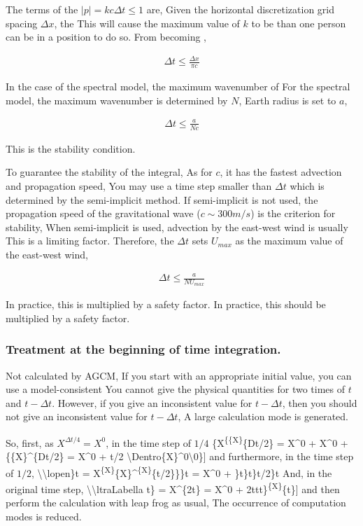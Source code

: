 The terms of the \(|p|=kc \Delta t \le 1\) are, Given the horizontal
discretization grid spacing \(\Delta x\), the This will cause the
maximum value of \(k\) to be \More than one person can be in a position
to do so. From becoming ,

\begin{eqnarray}
   \Delta t \le \frac{\Delta x}{\pi c}
\end{eqnarray}

In the case of the spectral model, the maximum wavenumber of For the
spectral model, the maximum wavenumber is determined by \(N\), Earth
radius is set to \(a\),

\begin{eqnarray}
   \Delta t \le \frac{a}{N c}  
\end{eqnarray}

This is the stability condition.

To guarantee the stability of the integral, As for \(c\), it has the
fastest advection and propagation speed, You may use a time step smaller
than \(\Delta t\) which is determined by the semi-implicit method. If
semi-implicit is not used, the propagation speed of the gravitational
wave (\(c \sim 300m/s\)) is the criterion for stability, When
semi-implicit is used, advection by the east-west wind is usually This
is a limiting factor. Therefore, the \(\Delta t\) sets \(U_{max}\) as
the maximum value of the east-west wind,

\begin{eqnarray}
   \Delta t \le \frac{a}{N U_{max}}  
\end{eqnarray}

In practice, this is multiplied by a safety factor. In practice, this
should be multiplied by a safety factor.

\hypertarget{treatment-at-the-beginning-of-time-integration.}{%
\subsubsection{Treatment at the beginning of time
integration.}\label{treatment-at-the-beginning-of-time-integration.}}

Not calculated by AGCM, If you start with an appropriate initial value,
you can use a model-consistent You cannot give the physical quantities
for two times of \(t\) and \(t-\Delta t\). However, if you give an
inconsistent value for \(t-\Delta t\), then you should not give an
inconsistent value for \(t-\Delta t\), A large calculation mode is
generated.

So, first, as \(X^{\Delta t/4} = X^0\), in the time step of \(1/4\)
\{X\textsuperscript{\{\{X\}}\{D\Delta t/2\} = X\^{}0 + X\^{}0 +
\{\{X\}\^{}\{D\Delta t/2\} = X\^{}0 + t/2
\textbackslash Dentro\{X\}\^{}0\textbackslash0\}{]} and furthermore, in
the time step of \(1/2\), \textbackslash\textbackslash lopen\}t =
X\textsuperscript{\{X\}}\{X\}\^{}\textsuperscript{\{X\}}\{\Delta t/2\}\}\lopen\}t
= X\^{}0 + \lopen\}t\lopen\}t\lopen\}t/2\lopen\}t And, in the original
time step, \textbackslash\textbackslash ltraLabella t\} =
X\^{}\{2\Delta t\} = X\^{}0 +
2 t t t\}\textsuperscript{\{X\}}\{ t\}{]}
and then perform the calculation with leap frog as usual, The occurrence
of computation modes is reduced.
